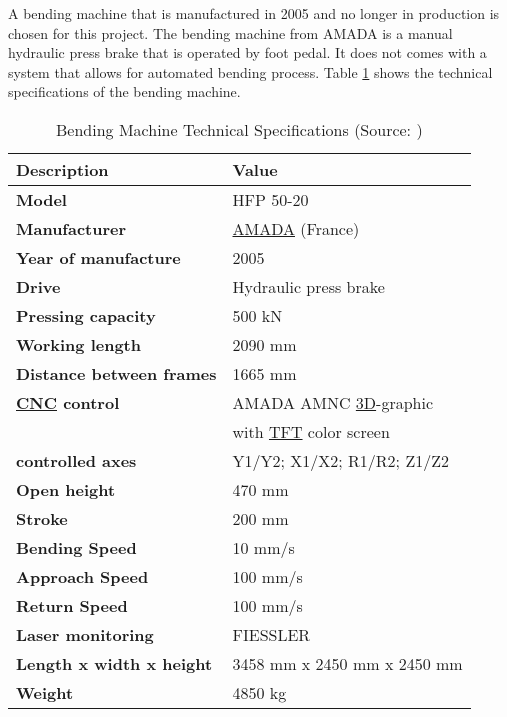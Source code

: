 A bending machine that is manufactured in 2005 and no longer in production is chosen for this project.
The bending machine from AMADA is a manual hydraulic press brake that is operated by foot pedal.
It does not comes with a system that allows for automated bending process.
Table \ref{tab:machine_specifications} shows the technical specifications of the bending machine.

\begin{table}[h!]
    \centering
    \renewcommand{\arraystretch}{1.2} %
    \small
    \begin{tabular}{ll}
        {\textbf{Description}} & {\textbf{Value}} \\
        \hline
        \textbf{Model} & HFP 50-20 \\
        \textbf{Manufacturer} & \hyperref[acro:AMADA]{AMADA} (France) \\
        \textbf{Year of manufacture} & 2005 \\
        \textbf{Drive} & Hydraulic press brake \\
        \textbf{Pressing capacity} & 500 kN \\
        \textbf{Working length} & 2090 mm \\
        \textbf{Distance between frames} & 1665 mm \\
        \textbf{\hyperref[acro:CNC]{CNC} control} & AMADA AMNC \hyperref[acro:3D]{3D}-graphic \\
        & with \hyperref[acro:TFT]{TFT} color screen \\
        \textbf{controlled axes} &  Y1/Y2; X1/X2; R1/R2; Z1/Z2 \\
        \textbf{Open height} & 470 mm \\
        \textbf{Stroke} & 200 mm \\
        \textbf{Bending Speed} & 10 mm/s \\
        \textbf{Approach Speed} & 100 mm/s \\
        \textbf{Return Speed} & 100 mm/s \\
        \textbf{Laser monitoring} & FIESSLER \\
        \textbf{Length x width x height} & 3458 mm x 2450 mm x 2450 mm \\
        \textbf{Weight} & 4850 kg \\ \hline
    \end{tabular}
    \caption{Bending Machine Technical Specifications (Source: \cite{bmspecifications})}
    \label{tab:machine_specifications}
\end{table}

